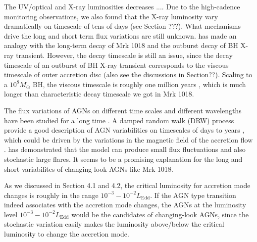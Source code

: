 \documentclass[twocolumn]{aastex63}
\begin{document}
The UV/optical and X-ray luminosities decreases .... Due to the high-cadence monitoring observations, we also found that the X-ray luminosity vary dramatically on timescale of tens of days (see Section ???). What mechanisms drive the long and short term flux variations are still unknown. \citet{Noda2018} has made an analogy with the long-term decay of Mrk 1018 and the outburst decay of BH X-ray transient. However, the decay timescale is still an issue, since the decay timescale of an outburst of BH X-ray transient corresponds to the viscous timescale of outer accretion disc (also see the discussions in Section??). Scaling to a $10^{8}M_{\odot}$ BH, the viscous timescale is roughly one million years \citep{2012MmSAI..83..469L,2018MNRAS.475.1190Y}, which is much longer than characteristic decay timescale we got in Mrk 1018. 

The flux variations of AGNs on different time scales and different wavelengths have been studied for a long time \citep[see reviews in ][]{1997ARA&A..35..445U}. A damped random walk (DRW) process provide a good description of AGN variabilities on timescales of days to years \citep[e.g. ][]{MacLeod2010,Kelly2011}, which could be driven by the variations in the magnetic field of the accretion flow \citep{King2004,Mayer&Pringle2006; Janiuk&Czerny 2007}. \citet{King2004} has demonstrated that the model can produce small flux fluctuations and also stochastic large flares. It seems to be a promising explanation for the long and short variabilites of changing-look AGNs like Mrk 1018. 

As we discussed in Section 4.1 and 4.2, the critical luminosity for accretion mode changes is roughly in the range $10^{-3}-10^{-2}L_\mathrm{Edd}$\citep[see also ][]{Liu2019}. If the AGN type transition indeed associates with the accretion mode changes, the AGNs at the luminosity level $10^{-3}-10^{-2}L_\mathrm{Edd}$ would be the candidates of changing-look AGNs, since the stochastic variation easily makes the luminosity above/below the critical luminosity to change the accretion mode. 




 
 
\end{document}
